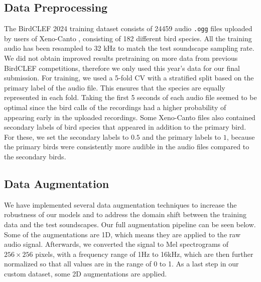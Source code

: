 \documentclass[
]{ceurart}
\begin{document}
\subsection{Data Preprocessing} \label{data-preprocessing}
The BirdCLEF 2024 training dataset consists of 24459 audio \texttt{.ogg} files uploaded by users of Xeno-Canto \cite{xeno}, consisting of 182 different bird species. All the training audio has been resampled to 32 kHz to match the test soundscape sampling rate. We did not obtain improved results pretraining on more data from previous BirdCLEF competitions, therefore we only used this year's data for our final submission. For training, we used a 5-fold CV with a stratified split based on the primary label of the audio file. This ensures that the species are equally represented in each fold. Taking the first 5 seconds of each audio file seemed to be optimal since the bird calls of the recordings had a higher probability of appearing early in the uploaded recordings. Some Xeno-Canto files also contained secondary labels of bird species that appeared in addition to the primary bird. For these, we set the secondary labels to $0.5$ and the primary labels to $1$, because the primary birds were consistently more audible in the audio files compared to the secondary birds.


    
\subsection{Data Augmentation} \label{data-augmentation}
We have implemented several data augmentation techniques to increase the robustness of our models and to address the domain shift between the training data and the test soundscapes. Our full augmentation pipeline can be seen below. Some of the augmentations are 1D, which means they are applied to the raw audio signal. Afterwards, we converted the signal to Mel spectrograms of $256\times256$ pixels, with a frequency range of 1Hz to 16kHz, which are then further normalized so that all values are in the range of 0 to 1. As a last step in our custom dataset, some 2D augmentations are applied. 
\end{document}
